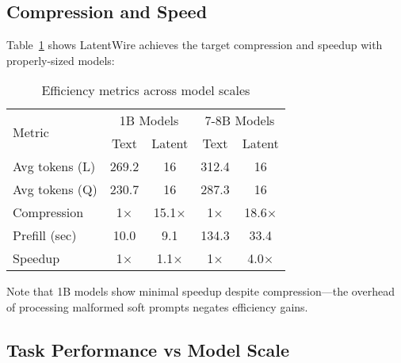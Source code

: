 \documentclass{article}
\begin{document}
\subsection{Compression and Speed}

Table~\ref{tab:efficiency_full} shows LatentWire achieves the target compression and speedup with properly-sized models:

\begin{table}[h]
\caption{Efficiency metrics across model scales}
\label{tab:efficiency_full}
\vskip 0.15in
\begin{center}
\begin{small}
\begin{tabular}{lcccc}
\toprule
\multirow{2}{*}{Metric} & \multicolumn{2}{c}{1B Models} & \multicolumn{2}{c}{7-8B Models} \\
& Text & Latent & Text & Latent \\
\midrule
Avg tokens (L) & 269.2 & 16 & 312.4 & 16 \\
Avg tokens (Q) & 230.7 & 16 & 287.3 & 16 \\
Compression & 1$\times$ & 15.1$\times$ & 1$\times$ & 18.6$\times$ \\
Prefill (sec) & 10.0 & 9.1 & 134.3 & 33.4 \\
Speedup & 1$\times$ & 1.1$\times$ & 1$\times$ & 4.0$\times$ \\
\bottomrule
\end{tabular}
\end{small}
\end{center}
\vskip -0.1in
\end{table}

Note that 1B models show minimal speedup despite compression—the overhead of processing malformed soft prompts negates efficiency gains.

\subsection{Task Performance vs Model Scale}
\end{document}
